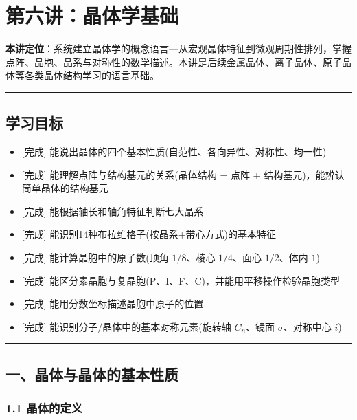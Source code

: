 \section{第六讲：晶体学基础}\label{ux7b2cux516dux8bb2ux6676ux4f53ux5b66ux57faux7840}

\textbf{本讲定位}：系统建立晶体学的概念语言---从宏观晶体特征到微观周期性排列，掌握点阵、晶胞、晶系与对称性的数学描述。本讲是后续金属晶体、离子晶体、原子晶体等各类晶体结构学习的语言基础。

\begin{center}\rule{0.5\linewidth}{0.5pt}\end{center}

\subsection{学习目标}\label{ux5b66ux4e60ux76eeux6807}

\begin{itemize}
\tightlist
\item
  {[}完成{]} 能说出晶体的四个基本性质(自范性、各向异性、对称性、均一性)
\item
  {[}完成{]} 能理解点阵与结构基元的关系(晶体结构 = 点阵 + 结构基元)，能辨认简单晶体的结构基元
\item
  {[}完成{]} 能根据轴长和轴角特征判断七大晶系
\item
  {[}完成{]} 能识别14种布拉维格子(按晶系+带心方式)的基本特征
\item
  {[}完成{]} 能计算晶胞中的原子数(顶角 \(1/8\)、棱心 \(1/4\)、面心 \(1/2\)、体内 \(1\))
\item
  {[}完成{]} 能区分素晶胞与复晶胞(P、I、F、C)，并能用平移操作检验晶胞类型
\item
  {[}完成{]} 能用分数坐标描述晶胞中原子的位置
\item
  {[}完成{]} 能识别分子/晶体中的基本对称元素(旋转轴 \(C_n\)、镜面 \(\sigma\)、对称中心 \(i\))
\end{itemize}

\begin{center}\rule{0.5\linewidth}{0.5pt}\end{center}

\subsection{一、晶体与晶体的基本性质}\label{ux4e00ux6676ux4f53ux4e0eux6676ux4f53ux7684ux57faux672cux6027ux8d28}

\subsubsection{1.1 晶体的定义}\label{ux6676ux4f53ux7684ux5b9aux4e49}

